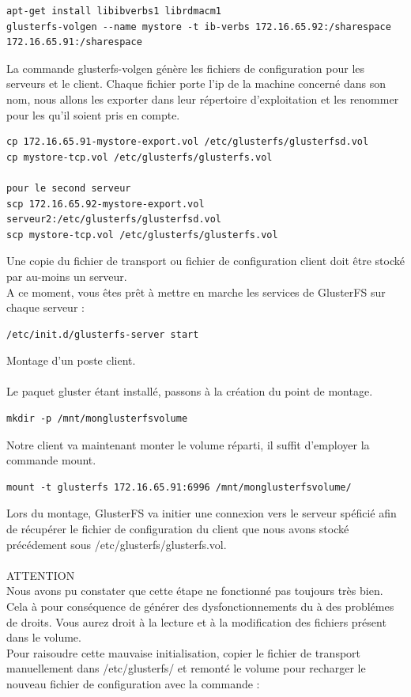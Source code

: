 \documentclass[12pt]{report}
\begin{document}
\begin{lstlisting}
apt-get install libibverbs1 librdmacm1
glusterfs-volgen --name mystore -t ib-verbs 172.16.65.92:/sharespace 172.16.65.91:/sharespace
	  \end{lstlisting}
La commande glusterfs-volgen génère les fichiers de configuration pour les serveurs et le client. Chaque fichier porte l'ip de la machine concerné dans son nom, nous allons les exporter dans leur répertoire d'exploitation et les renommer pour les qu'il soient pris en compte.
\begin{lstlisting}
cp 172.16.65.91-mystore-export.vol /etc/glusterfs/glusterfsd.vol
cp mystore-tcp.vol /etc/glusterfs/glusterfs.vol

pour le second serveur
scp 172.16.65.92-mystore-export.vol serveur2:/etc/glusterfs/glusterfsd.vol
scp mystore-tcp.vol /etc/glusterfs/glusterfs.vol
	  \end{lstlisting}
Une copie du fichier de transport ou fichier de configuration client doit être stocké par au-moins un serveur.\\
A ce moment, vous êtes prêt à mettre en marche les services de GlusterFS sur chaque serveur :
\begin{lstlisting}
/etc/init.d/glusterfs-server start
	  \end{lstlisting}
Montage d'un poste client.\\\\
Le paquet gluster étant installé, passons à la création du point de montage.
\begin{lstlisting}
mkdir -p /mnt/monglusterfsvolume
	  \end{lstlisting}
Notre client va maintenant monter le volume réparti, il suffit d'employer la commande mount.
\begin{lstlisting}
mount -t glusterfs 172.16.65.91:6996 /mnt/monglusterfsvolume/
	  \end{lstlisting}
Lors du montage, GlusterFS va initier une connexion vers le serveur spéficié afin de récupérer le fichier de configuration du client que nous avons stocké précédement sous /etc/glusterfs/glusterfs.vol.\\\\
ATTENTION\\
Nous avons pu constater que cette étape ne fonctionné pas toujours très bien. Cela à pour conséquence de générer des dysfonctionnements du à des problémes de droits. Vous aurez droit à la lecture et à la modification des fichiers présent dans le volume.\\
Pour raisoudre cette mauvaise initialisation, copier le fichier de transport manuellement dans /etc/glusterfs/ et remonté le volume pour recharger le nouveau fichier de configuration avec la commande :
\end{document}
